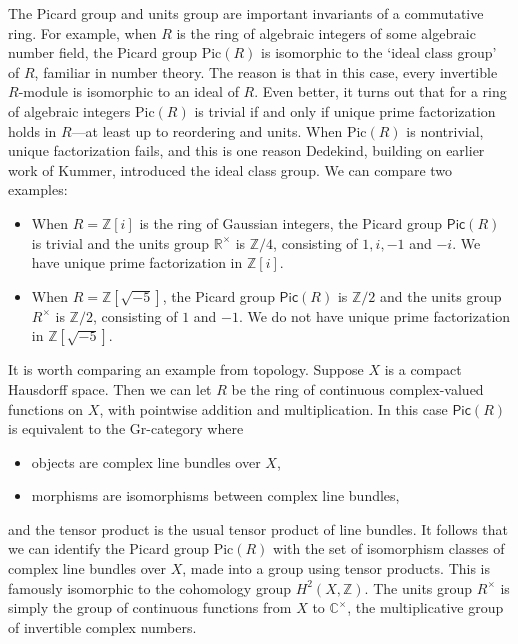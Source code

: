 \documentclass[reqno,12pt]{amsart}
\newcommand{\Pic}{\mathsf{Pic}}
\newcommand{\Z}{{\mathbb Z}}  %
\newcommand{\R}{{\mathbb R}}  %
\newcommand{\C}{{\mathbb C}}  %
\theoremstyle{definition}
\begin{document}
The Picard group and units group are important invariants of a commutative
ring.  For example, when $R$ is the ring of algebraic integers of some algebraic number field, the Picard group $\mathrm{Pic}(R)$ is isomorphic to the `ideal class group' of $R$, familiar in number theory.  The reason is that in this case, every invertible $R$-module is isomorphic to an ideal of $R$.  Even better, it turns  out that for a ring of algebraic integers $\mathrm{Pic}(R)$ is trivial if and only if unique prime factorization holds in $R$---at least up to reordering and units.   When $\mathrm{Pic}(R)$ is nontrivial, unique factorization fails, and this is one reason Dedekind, building on earlier work of Kummer, introduced the ideal class group.  We can compare two examples:

\begin{itemize}
\item
When $R = \Z[i]$ is the ring of Gaussian integers, the Picard group 
$\Pic(R)$ is trivial and the units group $\R^\times$ is $\Z/4$, consisting of
$1, i, -1$ and $-i$.  We have unique prime factorization in $\Z[i]$.
\item
When $R = \Z[\sqrt{-5}]$, the Picard group $\Pic(R)$ is $\Z/2$ and the
units group $R^\times$ is $\Z/2$, consisting of $1$ and $-1$.  We do not have
unique prime factorization in $\Z[\sqrt{-5}]$.
\end{itemize}

It is worth comparing an example from topology.  Suppose $X$ is a compact Hausdorff space.  Then we can let $R$ be the ring of continuous complex-valued functions on $X$, with pointwise addition and multiplication.  In this case $\Pic(R)$ is equivalent to the Gr-category where
\begin{itemize}
\item objects are complex line bundles over $X$,
\item morphisms are isomorphisms between complex line bundles,
\end{itemize}
and the tensor product is the usual tensor product of line bundles.
It follows that we can identify the Picard group $\mathrm{Pic}(R)$ with the set of
isomorphism classes of complex line bundles over $X$, made into a group using
tensor products.   This is famously isomorphic to the cohomology group $H^2(X,\Z)$.  The units group $R^\times$ is simply the group of continuous functions from $X$ to $\C^\times$, the multiplicative group of invertible complex numbers. 
\end{document}
